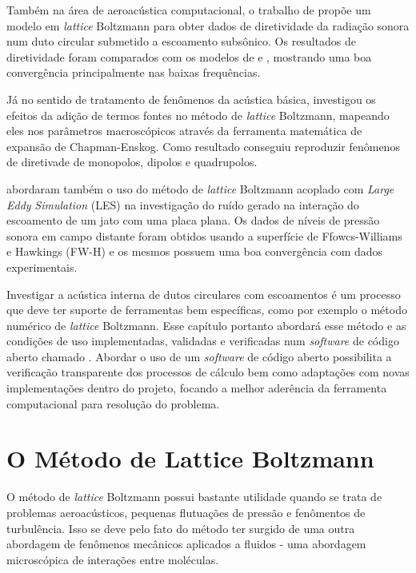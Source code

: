 Também na área de aeroacústica computacional, o trabalho de  propõe um modelo em \textit{lattice} Boltzmann para obter dados de diretividade da radiação sonora num duto circular submetido a escoamento subsônico. Os resultados de diretividade foram comparados com os modelos de  e , mostrando uma boa convergência principalmente nas baixas frequências.

Já no sentido de tratamento de fenômenos da acústica básica,  investigou os efeitos da adição de termos fontes no método de \textit{lattice} Boltzmann, mapeando eles nos parâmetros macroscópicos através da ferramenta matemática de expansão de Chapman-Enskog. Como resultado conseguiu reproduzir fenômenos de diretivade de monopolos, dipolos e quadrupolos.

 abordaram também o uso do método de \textit{lattice} Boltzmann acoplado com \textit{Large} \textit{Eddy} \textit{Simulation} (LES) na investigação do ruído gerado na interação do escoamento de um jato com uma placa plana. Os dados de níveis de pressão sonora em campo distante foram obtidos usando a superfície de Ffowcs-Williams e Hawkings (FW-H) e os mesmos possuem uma boa convergência com dados experimentais.

Investigar a acústica interna de dutos circulares com escoamentos é um processo que deve ter suporte de ferramentas bem específicas, como por exemplo o método numérico de \textit{lattice} Boltzmann. Esse capítulo portanto abordará esse método e as condições de uso implementadas, validadas e verificadas num \textit{software} de código aberto chamado . Abordar o uso de um \textit{software} de código aberto possibilita a verificação transparente dos processos de cálculo bem como adaptações com novas implementações dentro do projeto, focando a melhor aderência da ferramenta computacional para resolução do problema.


\section{O Método de Lattice Boltzmann}

O método de \textit{lattice} Boltzmann possui bastante utilidade quando se trata de problemas aeroacústicos, pequenas flutuações de pressão e fenômentos de turbulência. Isso se deve pelo fato do método ter surgido de uma outra abordagem de fenômenos mecânicos aplicados a fluidos - uma abordagem microscópica de interações entre moléculas.

